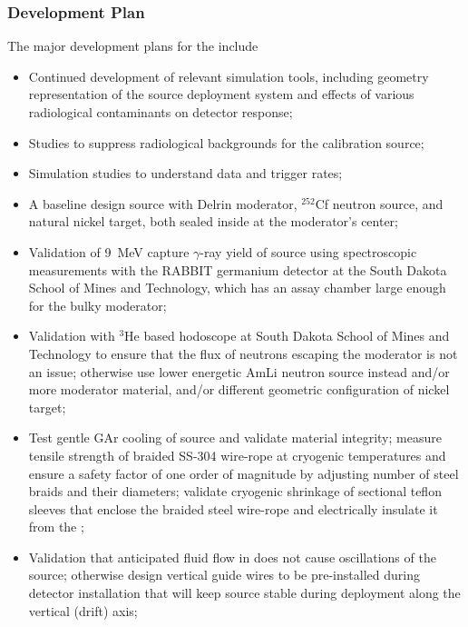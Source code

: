\subsubsection{Development Plan}
The major development plans for the  include
\begin{itemize}
\item Continued development of relevant simulation tools, including geometry representation of the source deployment system and effects of various radiological contaminants on detector response; 
\item Studies to suppress radiological backgrounds for the calibration source;
\item Simulation studies to understand data and trigger rates;
\item A baseline design source with Delrin moderator, $^{252}$Cf neutron source, and natural nickel target, both sealed inside at the moderator's center;
\item Validation of \SI{9}{\MeV} capture $\gamma$-ray yield of source using spectroscopic measurements with the RABBIT germanium detector at the South Dakota School of Mines and Technology, which has an assay chamber large enough for the bulky moderator; 
\item Validation with $^{3}$He based hodoscope at South Dakota School of Mines and Technology to ensure that the flux of neutrons escaping the moderator is not an issue; otherwise use lower energetic AmLi neutron source instead and/or more moderator material, and/or different geometric configuration of nickel target; 
\item Test gentle GAr cooling of source and validate material integrity; measure tensile strength of braided SS-304 wire-rope at cryogenic temperatures and ensure a safety factor of one order of magnitude by adjusting number of steel braids and their diameters; validate cryogenic shrinkage of sectional teflon sleeves that enclose the braided steel wire-rope and electrically insulate it from the ; 
\item Validation that anticipated fluid flow in  does not cause oscillations of the source; otherwise design vertical guide wires to be pre-installed during detector installation 
that will keep source stable during deployment along the vertical (drift) axis;

\end{itemize}
